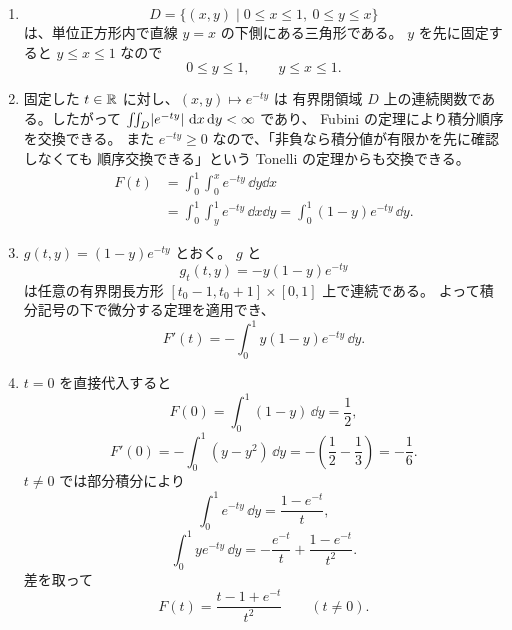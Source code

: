 \begin{enumerate}
  \item
  \[
  D=\{(x,y)\mid0\le x\le1,\ 0\le y\le x\}
  \]
  は、単位正方形内で直線 \(y=x\) の下側にある三角形である。
  \(y\) を先に固定すると \(y\le x\le1\) なので
  \[
  \boxed{0\le y\le1,\qquad y\le x\le1}.
  \]

  \begin{center}
  \end{center}

  \item 固定した \(t\in\mathbb R\) に対し、\((x,y)\mapsto e^{-ty}\) は
  有界閉領域 \(D\) 上の連続関数である。したがって
  \(\iint_D\lvert e^{-ty}\rvert\,\,\mathrm d x\,\mathrm d y<\infty\) であり、
  Fubini の定理により積分順序を交換できる。
  また \(e^{-ty}\ge0\) なので、「非負なら積分値が有限かを先に確認しなくても
  順序交換できる」という Tonelli の定理からも交換できる。
  \[
  \begin{aligned}
  F(t)
  &=\int_0^1\int_0^x e^{-ty}\,\dd y\dd x\\
  &=\int_0^1\int_y^1 e^{-ty}\,\dd x\dd y
  =\boxed{\int_0^1(1-y)e^{-ty}\,\dd y}.
  \end{aligned}
  \]

  \item \(g(t,y)=(1-y)e^{-ty}\) とおく。
  \(g\) と
  \[
  g_t(t,y)=-y(1-y)e^{-ty}
  \]
  は任意の有界閉長方形
  \([t_0-1,t_0+1]\times[0,1]\) 上で連続である。
  よって積分記号の下で微分する定理を適用でき、
  \[
  \boxed{F'(t)=-\int_0^1y(1-y)e^{-ty}\,\dd y}.
  \]

  \item \(t=0\) を直接代入すると
  \[
  F(0)=\int_0^1(1-y)\,\dd y=\boxed{\frac12},
  \]
  \[
  F'(0)=-\int_0^1(y-y^2)\,\dd y
  =-\left(\frac12-\frac13\right)
  =\boxed{-\frac16}.
  \]
  \(t\ne0\) では部分積分により
  \[
  \int_0^1e^{-ty}\,\dd y=\frac{1-e^{-t}}t,
  \]
  \[
  \int_0^1ye^{-ty}\,\dd y
  =-\frac{e^{-t}}t+\frac{1-e^{-t}}{t^2}.
  \]
  差を取って
  \[
  \boxed{F(t)=\frac{t-1+e^{-t}}{t^2}}\qquad(t\ne0).
  \]
\end{enumerate}


